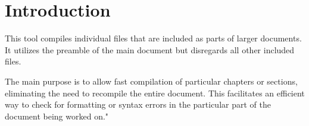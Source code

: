
\section{Introduction}
This tool compiles individual files that are included as parts of larger documents. 
It utilizes the preamble of the main document but disregards all other included files.

The main purpose is to allow fast compilation of particular chapters or sections, 
eliminating the need to recompile the entire document.
This facilitates an efficient way to check for formatting or syntax errors in
the particular part of the document being worked on."

